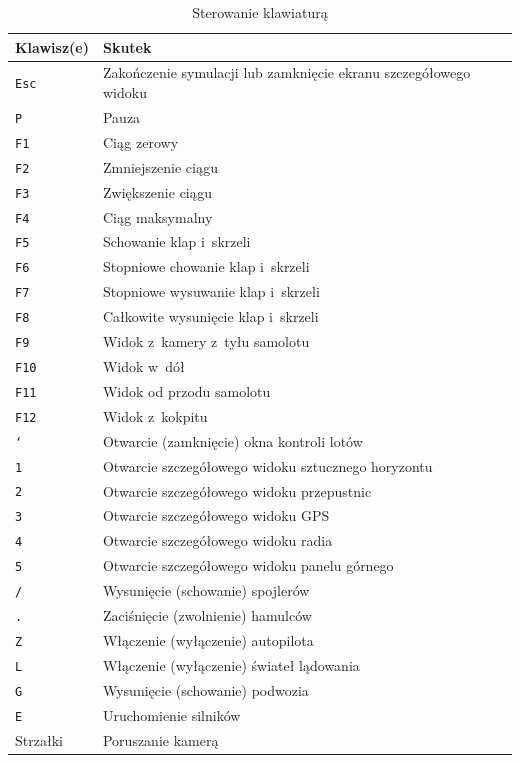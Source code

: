 \documentclass{mwrep}
\begin{document}
\begin{center}
\begin{table}[h]
\begin{center}
\caption{Sterowanie klawiaturą}\label{T:Sterowanie_klawiatura}
\vspace{3ex}
\begin{tabularx}{1\textwidth}{|l|X|}
\hline
Klawisz(e) & Skutek \\ \hline
\texttt{Esc} & Zakończenie symulacji lub zamknięcie ekranu szczegółowego widoku \\
\texttt{P} & Pauza \\
\texttt{F1} & Ciąg zerowy \\
\texttt{F2} & Zmniejszenie ciągu \\
\texttt{F3} & Zwiększenie ciągu \\
\texttt{F4} & Ciąg maksymalny \\
\texttt{F5} & Schowanie klap i~skrzeli \\
\texttt{F6} & Stopniowe chowanie klap i~skrzeli \\
\texttt{F7} & Stopniowe wysuwanie klap i~skrzeli \\
\texttt{F8} & Całkowite wysunięcie klap i~skrzeli \\
\texttt{F9} & Widok z~kamery z~tyłu samolotu \\
\texttt{F10} & Widok w~dół \\
\texttt{F11} & Widok od przodu samolotu \\
\texttt{F12} & Widok z~kokpitu \\
\texttt{`} & Otwarcie (zamknięcie) okna kontroli lotów \\
\texttt{1} & Otwarcie szczegółowego widoku sztucznego horyzontu \\
\texttt{2} & Otwarcie szczegółowego widoku przepustnic \\
\texttt{3} & Otwarcie szczegółowego widoku GPS \\
\texttt{4} & Otwarcie szczegółowego widoku radia \\
\texttt{5} & Otwarcie szczegółowego widoku panelu górnego \\
\texttt{/} & Wysunięcie (schowanie) spojlerów \\
\texttt{.} & Zaciśnięcie (zwolnienie) hamulców \\
\texttt{Z} & Włączenie (wyłączenie) autopilota \\
\texttt{L} & Włączenie (wyłączenie) świateł lądowania \\
\texttt{G} & Wysunięcie (schowanie) podwozia \\
\texttt{E} & Uruchomienie silników \\
Strzałki & Poruszanie kamerą \\
\hline
\end{tabularx}
\end{center}
\end{table}
\end{center}
\end{document}
